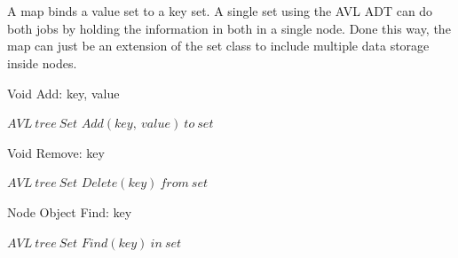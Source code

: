 \documentclass[journal]{IEEEtran}
\begin{document}
\section{}

A map binds a value set to a key set. A single set using the AVL ADT can do both jobs by holding the information in both in a single node.
Done this way, the map can just be an extension of the set class to include multiple data storage inside nodes.

\begin{algorithm}
    \caption{Void Add: key, value}
    \begin{algorithmic}
        \REQUIRE $AVL~tree~Set$
        \STATE $Add(key,~value)~to~set$
    \end{algorithmic}
\end{algorithm}

\begin{algorithm}
    \caption{Void Remove: key}
    \begin{algorithmic}
        \REQUIRE $AVL~tree~Set$
        \STATE $Delete(key)~from~set$
    \end{algorithmic}
\end{algorithm}

\begin{algorithm}
    \caption{Node Object Find: key}
    \begin{algorithmic}
        \REQUIRE $AVL~tree~Set$
        \RETURN $Find(key)~in~set$
    \end{algorithmic}
\end{algorithm}
\end{document}
